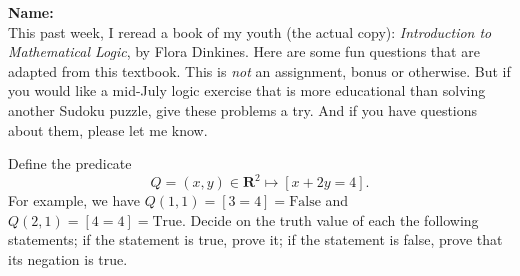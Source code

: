 \documentclass[12pt,fleqn,answers]{exam}
\newcommand{\reals}{\mathbf{R}}
\begin{document}
\large
\vspace{0.1in}
\noindent{}
{\bf Name:}  \\

\noindent This past week, I reread a book of my youth (the actual copy): \emph{Introduction
to Mathematical Logic}, by Flora Dinkines. Here are 
some fun questions that are adapted from this textbook. This is 
\emph{not} an assignment, bonus or otherwise. But if you would like 
a mid-July logic exercise that is more educational than 
solving another  Sudoku puzzle, give these problems a try. And if you have 
questions about them, please let me know.

\begin{questions}
\question Define the predicate 
\begin{equation*}
   Q = (x,y) \in \reals^2 \mapsto [x + 2 y = 4].
\end{equation*}
For example, we have $Q(1,1) = [3 = 4] = \mbox{False}$
and $Q(2,1) = [ 4= 4] = \mbox{True}$. Decide on the truth 
value of each the following statements; if the statement 
is true, prove it; if the statement is false, prove that 
its negation is true.

\end{questions}
\end{document}
